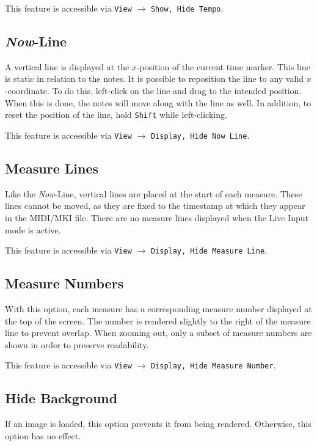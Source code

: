 \documentclass[english]{article}
\providecommand{\mi}[1]{\texttt{#1}}
\begin{document}
This feature is accessible via 
\mi{View} $\rightarrow$ \mi{{Show, Hide} Tempo}.

\subsection{\textit{Now}-Line}

A vertical line is displayed at the $x$-position of the current time marker. This line is static in relation to the notes.
It is possible to reposition the line to any valid $x$-coordinate. To do this, left-click on the line and drag to the 
intended position. When this is done, the notes will move along with the line as well. In addition, to reset the position of
the line, hold \mi{Shift} while left-clicking.

This feature is accessible via 
\mi{View} $\rightarrow$ \mi{{Display, Hide} Now Line}.

\subsection{Measure Lines}

Like the \textit{Now}-Line, vertical lines are placed at the start of each measure. These lines cannot be moved, as 
they are fixed to the timestamp at which they appear in the MIDI/MKI file.
There are no measure lines displayed when the Live Input mode is active.

This feature is accessible via 
\mi{View} $\rightarrow$ \mi{{Display, Hide} Measure Line}.

\subsection{Measure Numbers}

With this option, each measure has a corresponding measure number displayed at the top of the screen. The number is rendered
slightly to the right of the measure line to prevent overlap. When zooming out, only a subset of measure numbers are shown in
order to preserve readability.

This feature is accessible via 
\mi{View} $\rightarrow$ \mi{{Display, Hide} Measure Number}.

\subsection{Hide Background}

If an image is loaded, this option prevents it from being rendered. Otherwise, this option has no effect.
\end{document}
